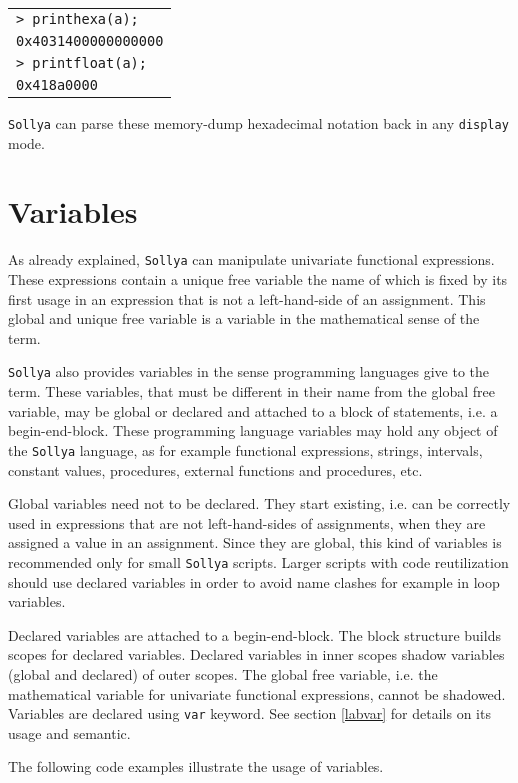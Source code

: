 \documentclass[a4paper]{article}
\newcommand{\key}[1]{\texttt{#1}}
\newcommand{\sollya}{\texttt{Sollya}\xspace}
\newcommand{\code}[1]{
\begin{center}
\begin{tabular}{|p{14.8cm}|}
\hline
#1
\hline
\end{tabular}
\end{center}
}
\newcommand{\ligne}[1]{\texttt{#1}\\}
\begin{document}
\code{
\ligne{> printhexa(a);}
\ligne{0x4031400000000000}
\ligne{> printfloat(a);}
\ligne{0x418a0000}
}

\sollya can parse these memory-dump hexadecimal notation back in any \key{display} mode.

\section{Variables}\label{variables}

As already explained, \sollya can manipulate univariate functional
expressions. These expressions contain a unique free variable the name
of which is fixed by its first usage in an expression that is not a
left-hand-side of an assignment. This global and unique free variable is 
a variable in the mathematical sense of the term. 

\sollya also provides variables in the sense programming languages
give to the term.  These variables, that must be different in their
name from the global free variable, may be global or declared and
attached to a block of statements, i.e. a begin-end-block. These
programming language variables may hold any object of the \sollya
language, as for example functional expressions, strings, intervals,
constant values, procedures, external functions and procedures, etc.

Global variables need not to be declared. They start existing,
i.e. can be correctly used in expressions that are not left-hand-sides
of assignments, when they are assigned a value in an assignment. Since
they are global, this kind of variables is recommended only for small
\sollya scripts.  Larger scripts with code reutilization should use
declared variables in order to avoid name clashes for example in loop
variables.

Declared variables are attached to a begin-end-block. The block
structure builds scopes for declared variables. Declared variables in
inner scopes shadow variables (global and declared) of outer
scopes. The global free variable, i.e. the mathematical variable for
univariate functional expressions, cannot be shadowed. Variables are
declared using \key{var} keyword. See section \ref{labvar} for details
on its usage and semantic.

The following code examples illustrate the usage of variables.
\end{document}
